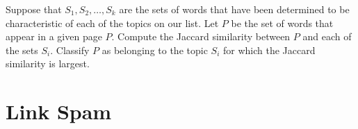Suppose that $S_1, S_2, \ldots, S_k$ are the sets of words that have been determined to be characteristic of each of the topics on our list. Let $P$ be the set of words that appear in a given page $P$. Compute the Jaccard similarity between $P$ and each of the sets $S_i$. Classify $P$ as belonging to the topic $S_i$ for which the Jaccard similarity is largest.

\section{Link Spam}\label{sec:link-spam}

